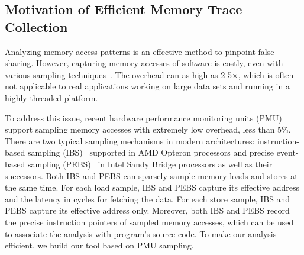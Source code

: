 \sloppy
\subsection{Motivation of Efficient Memory Trace Collection}
Analyzing memory access patterns is an effective method to pinpoint false sharing. However, capturing memory accesses of software is costly, even with various sampling techniques~\cite{}. The overhead can as high as 2-5$\times$, which is often not applicable to real applications working on large data sets and running in a highly threaded platform. 

To address this issue, recent hardware performance monitoring units (PMU) support sampling memory accesses with extremely low overhead, less than 5\%. There are two typical sampling mechanisms in modern architectures: instruction-based sampling (IBS)~\cite{} supported in AMD Opteron processors and precise event-based sampling (PEBS)~\cite{} in Intel Sandy Bridge processors as well as their successors. Both IBS and PEBS can sparsely sample memory loads and stores at the same time. For each load sample, IBS and PEBS capture its effective address and the latency in cycles for fetching the data. For each store sample, IBS and PEBS capture its effective address only. Moreover, both IBS and PEBS record the precise instruction pointers of sampled memory accesses, which can be used to associate the analysis with program's source code. To make our analysis efficient, we build our tool based on PMU sampling. 

 



